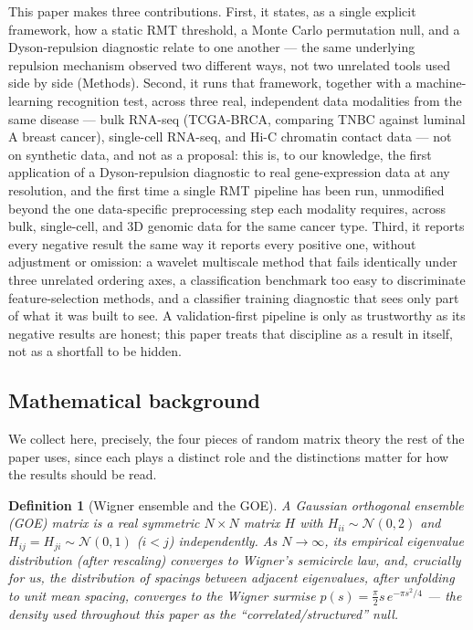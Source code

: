 \documentclass[11pt]{article}
\newtheorem{definition}{Definition}
\begin{document}
This paper makes three contributions. First, it states, as a single
explicit framework, how a static RMT threshold, a Monte Carlo
permutation null, and a Dyson-repulsion diagnostic relate to one
another --- the same underlying repulsion mechanism observed two
different ways, not two unrelated tools used side by side (Methods).
Second, it runs that framework, together with a machine-learning
recognition test, across three real, independent data modalities from
the same disease --- bulk RNA-seq (TCGA-BRCA, comparing TNBC against
luminal A breast cancer), single-cell RNA-seq, and Hi-C chromatin
contact data --- not on synthetic data, and not as a proposal: this is,
to our knowledge, the first application of a Dyson-repulsion diagnostic
to real gene-expression data at any resolution, and the first time a
single RMT pipeline has been run, unmodified beyond the one
data-specific preprocessing step each modality requires, across bulk,
single-cell, and 3D genomic data for the same cancer type. Third, it
reports every negative result the same way it reports every positive
one, without adjustment or omission: a wavelet multiscale method that
fails identically under three unrelated ordering axes, a classification
benchmark too easy to discriminate feature-selection methods, and a
classifier training diagnostic that sees only part of what it was built
to see. A validation-first pipeline is only as trustworthy as its
negative results are honest; this paper treats that discipline as a
result in itself, not as a shortfall to be hidden.

\subsection{Mathematical background}
\label{sec:math}

We collect here, precisely, the four pieces of random matrix theory the
rest of the paper uses, since each plays a distinct role and the
distinctions matter for how the results should be read.

\begin{definition}[Wigner ensemble and the GOE]
\label{def:goe}
A Gaussian orthogonal ensemble (GOE) matrix is a real symmetric
$N\times N$ matrix $H$ with $H_{ii}\sim\mathcal N(0,2)$ and
$H_{ij}=H_{ji}\sim\mathcal N(0,1)$ ($i<j$) independently. As
$N\to\infty$, its empirical eigenvalue distribution (after rescaling)
converges to Wigner's semicircle law, and, crucially for us, the
distribution of \emph{spacings} between adjacent eigenvalues, after
unfolding to unit mean spacing, converges to the Wigner surmise
$p(s)=\frac{\pi}{2}s\,e^{-\pi s^2/4}$ --- the density used throughout
this paper as the ``correlated/structured'' null.
\end{definition}
\end{document}
